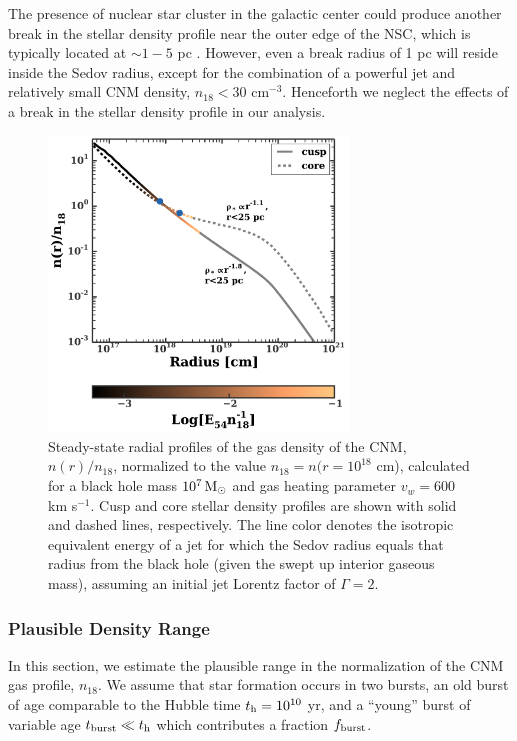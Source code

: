 \documentclass[usenatbib,fleqn]{mnras}
\newcommand{\Msun}{{\rm M_\odot}}
\begin{document}
The presence of nuclear star
cluster in the galactic center could produce another break in the
stellar density profile near the outer edge of the NSC, which is
typically located at $\sim 1-5$ pc \citep{Georgiev+2014}.  However,
even a break radius of 1 pc will reside inside the Sedov radius,
except for the combination of a powerful jet and relatively small CNM
density, $n_{18}<30$ cm$^{-3}$.  Henceforth we neglect the effects of
a break in the stellar density profile in our analysis.


\begin{figure}
\includegraphics[width=8cm]{sedov_radius.pdf}
\caption{\label{fig:profiles} Steady-state radial profiles of the gas
  density of the CNM, $n(r)/n_{18}$, normalized to the value $n_{18} =
  n(r = 10^{18}$ cm), calculated for a black hole mass $10^{7}
  \,\Msun$ and gas heating parameter $v_w=600$ km s$^{-1}$.  Cusp and
  core stellar density profiles are shown with solid and dashed lines,
  respectively.  The line color denotes the isotropic equivalent
  energy of a jet for which the Sedov radius equals that radius from
  the black hole (given the swept up interior gaseous mass), assuming
  an initial jet Lorentz factor of $\Gamma=2$.}
\end{figure}



\subsubsection{Plausible Density Range}
\label{sec:densAllowed}

In this section, we estimate the plausible range in the normalization
of the CNM gas profile, $n_{18}$.  We assume that star formation
occurs in two bursts, an old burst of age comparable to the Hubble
time $t_{\rm h} = 10^{10}$ yr, and a ``young'' burst of variable age
$t_{\rm burst} \ll t_{\rm h}$ which contributes a fraction $f_{\rm
  burst}$.
\end{document}
